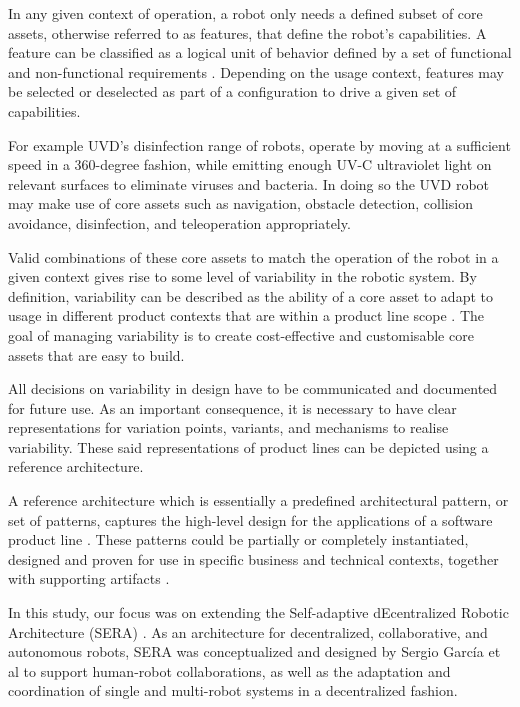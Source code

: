 \documentclass[conference]{IEEEtran}
\begin{document}
In any given context of operation, a robot only needs a defined subset of core assets, otherwise referred to as features, that define the robot's capabilities. A feature can be classified as a logical unit of behavior defined by a set of functional and non-functional requirements \cite{feats}. Depending on the usage context, features may be selected or deselected as part of a configuration to drive a given set of capabilities. 

For example UVD's disinfection range of robots, operate by moving at a sufficient speed in a 360-degree fashion, while emitting enough UV-C ultraviolet light on relevant surfaces to eliminate viruses and bacteria. In doing so the UVD robot may make use of core assets such as navigation, obstacle detection, collision avoidance, disinfection, and teleoperation appropriately.

Valid combinations of these core assets to match the operation of the robot in a given context gives rise to some level of variability in the robotic system. By definition, variability can be described as the ability of a core asset to adapt to usage in different product contexts that are within a product line scope \cite{variab}. The goal of managing variability is to create cost-effective and customisable core assets that are easy to build.

All decisions on variability in design have to be communicated and documented for future use. As an important consequence, it is necessary to have clear representations for variation points, variants, and mechanisms to realise variability. These said representations of product lines can be depicted using a reference architecture.

A reference architecture which is essentially a predefined architectural pattern, or set of patterns, captures the high-level design for the applications of a software product line \cite{sple}. These patterns could be partially or completely instantiated, designed and proven for use in specific business and technical contexts, together with supporting artifacts \cite{ref-arch}.

In this study, our focus was on extending the Self-adaptive dEcentralized Robotic Architecture (SERA) \cite{sera}. As an architecture for decentralized, collaborative, and autonomous robots, SERA was conceptualized and designed by Sergio Garc\'{i}a et al to support human-robot collaborations, as well as the adaptation and coordination of single and multi-robot systems in a decentralized fashion.
\end{document}
